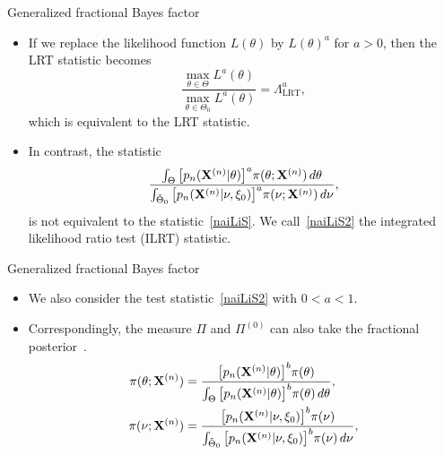 \documentclass{beamer}
\theoremstyle{plain}
\theoremstyle{definition}
\theoremstyle{remark}
\begin{document}
\begin{frame}{Generalized fractional Bayes factor}
    
    \begin{itemize}
        \item 
If we replace the likelihood function $L(\theta)$ by $L(\theta)^a$ for $a>0$, then the LRT statistic becomes
\begin{equation*}
    \frac{\max_{\theta\in\Theta}L^{a}(\theta)}{\max_{\theta\in\Theta_0}L^a(\theta)}=\Lambda^a_{\text{LRT}},
\end{equation*}
which is equivalent to the LRT statistic.
\item
In contrast, the statistic
\begin{equation}\label{naiLiS2}
    \frac{\int_{\Theta} \big[p_n(\mathbf{X}^{(n)}|\theta)\big]^{a}\pi(\theta;\mathbf{X}^{(n)})\,d\theta}{\int_{\tilde{\Theta}_0} \big[p_n(\mathbf{X}^{(n)}|\nu,\xi_0)\big]^{a}\pi(\nu;\mathbf{X}^{(n)})\,d\nu},
\end{equation}
is not equivalent to the statistic~\eqref{naiLiS}.
We call~\eqref{naiLiS2} the integrated likelihood ratio test (ILRT) statistic.
    \end{itemize}
\end{frame}

\begin{frame}{Generalized fractional Bayes factor}
\begin{itemize}
\item
We also consider the test statistic~\eqref{naiLiS2} with $0<a<1$.
    \item 
Correspondingly, the measure $\Pi$ and $\Pi^{(0)}$ can also take the fractional posterior~\cite{Bha2016}.
\begin{equation}\label{firstWeight}
    \begin{split}
\pi(\theta;\mathbf{X}^{(n)})&=\frac{\big[p_n(\mathbf{X}^{(n)}|\theta)\big]^b \pi(\theta)}{\int_{\Theta}\big[p_n(\mathbf{X}^{(n)}|\theta)\big]^b \pi(\theta)\, d\theta},
\\
\pi(\nu;\mathbf{X}^{(n)})&=\frac{\big[p_n(\mathbf{X}^{(n)}|\nu,
    \xi_0)\big]^b \pi(\nu)}{\int_{\tilde{\Theta}_0}\big[p_n(\mathbf{X}^{(n)}|\nu,\xi_0)\big]^b \pi(\nu)\, d\nu},
\end{split}
\end{equation}
\end{itemize}
\end{frame}
\end{document}
